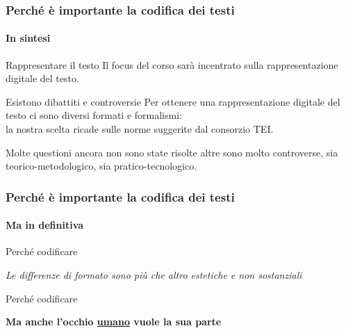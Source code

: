 \begin{frame}
    \frametitle{Perché è importante la codifica dei testi}
    \framesubtitle{In sintesi}
    \addtocounter{nframe}{1}
    
    \begin{block}{Rappresentare il testo}
         Il focus del corso sarà incentrato sulla rappresentazione digitale del testo.
    \end{block}

    \begin{block}{Esistono dibattiti e controversie}
        Per ottenere una rappresentazione digitale del testo ci sono diversi formati e formalismi:
        \\ la nostra scelta ricade sulle norme suggerite dal consorzio TEI.
    
        Molte questioni ancora non sono state risolte altre sono molto controverse, sia teorico-metodologico, sia pratico-tecnologico.
   
    \end{block}

\end{frame}

\begin{frame}
    \frametitle{Perché è importante la codifica dei testi}
    \framesubtitle{Ma in definitiva}
    \addtocounter{nframe}{1}
    
    \begin{block}{Perché codificare}

        \begin{center}
            \textit{Le differenze di formato sono più che altro estetiche e non sostanziali}
        \end{center}

    \end{block}
     

    \begin{block}{Perché codificare}

        \begin{center}
            \textbf{Ma anche l'occhio \underline{umano} vuole la sua parte}
        \end{center}
       
    \end{block}

\end{frame}

